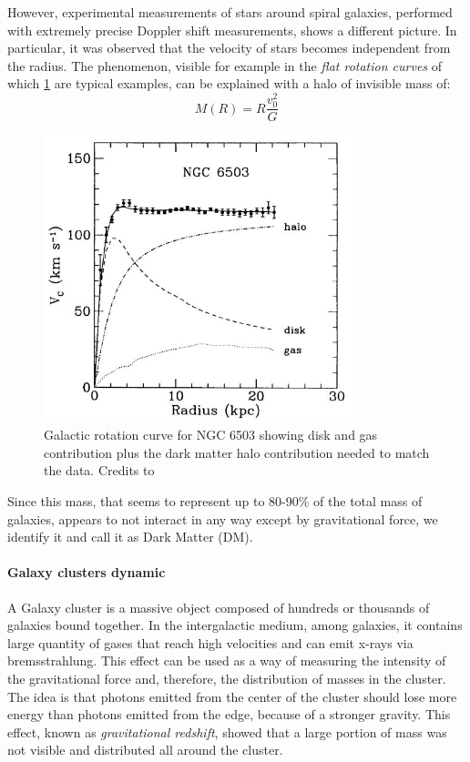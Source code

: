However, experimental measurements of stars around spiral galaxies, performed with extremely precise Doppler shift measurements, shows a different picture.
In particular, it was observed that the velocity of stars becomes independent from the radius.
The phenomenon, visible for example in the \textit{flat rotation curves} of which \cref{fig:flat_rot_curves} are typical examples, can be explained with a halo of invisible mass of:
\begin{equation}
    M(R) = R\frac{v_0^2}{G}
\end{equation}

\begin{figure}
    \centering
    \includegraphics[width=9cm]{Theory/figures/flat_rot_curves.jpg}
    \caption[Flat rotation curves]{Galactic rotation curve for NGC 6503 showing disk and gas contribution plus the dark matter halo contribution needed to match the data. Credits to \cite{fig_rot}}
    \label{fig:flat_rot_curves}
\end{figure}

Since this mass, that seems to represent up to 80-90\% of the total mass of galaxies, appears to not interact in any way except by gravitational force, we identify it and call it as Dark Matter (DM).

\paragraph{Galaxy clusters dynamic}

A Galaxy cluster is a massive object composed of hundreds or thousands of galaxies bound together. 
In the intergalactic medium, among galaxies, it contains large quantity of gases that reach high velocities and can emit x-rays via bremsstrahlung.
This effect can be used as a way of measuring the intensity of the gravitational force and, therefore, the distribution of masses in the cluster.
The idea is that photons emitted from the center of the cluster should lose more energy than photons emitted from the edge, because of a stronger gravity.
This effect, known as \textit{gravitational redshift}, showed that a large portion of mass was not visible and distributed all around the cluster.

